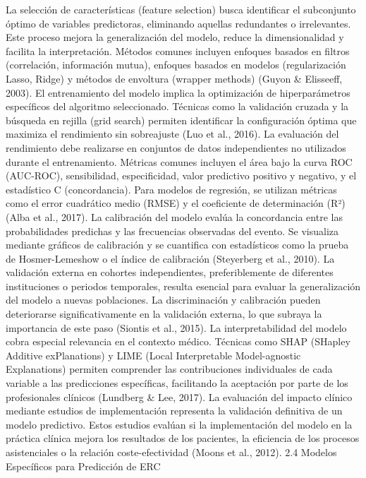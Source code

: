 \documentclass{article}
\begin{document}
\begin{multicols}{2}
La selección de características (feature selection) busca identificar el subconjunto óptimo de variables predictoras, eliminando aquellas redundantes o irrelevantes. Este proceso mejora la generalización del modelo, reduce la dimensionalidad y facilita la interpretación. Métodos comunes incluyen enfoques basados en filtros (correlación, información mutua), enfoques basados en modelos (regularización Lasso, Ridge) y métodos de envoltura (wrapper methods) (Guyon \& Elisseeff, 2003).
El entrenamiento del modelo implica la optimización de hiperparámetros específicos del algoritmo seleccionado. Técnicas como la validación cruzada y la búsqueda en rejilla (grid search) permiten identificar la configuración óptima que maximiza el rendimiento sin sobreajuste (Luo et al., 2016).
La evaluación del rendimiento debe realizarse en conjuntos de datos independientes no utilizados durante el entrenamiento. Métricas comunes incluyen el área bajo la curva ROC (AUC-ROC), sensibilidad, especificidad, valor predictivo positivo y negativo, y el estadístico C (concordancia). Para modelos de regresión, se utilizan métricas como el error cuadrático medio (RMSE) y el coeficiente de determinación (R²) (Alba et al., 2017).
La calibración del modelo evalúa la concordancia entre las probabilidades predichas y las frecuencias observadas del evento. Se visualiza mediante gráficos de calibración y se cuantifica con estadísticos como la prueba de Hosmer-Lemeshow o el índice de calibración (Steyerberg et al., 2010).
La validación externa en cohortes independientes, preferiblemente de diferentes instituciones o periodos temporales, resulta esencial para evaluar la generalización del modelo a nuevas poblaciones. La discriminación y calibración pueden deteriorarse significativamente en la validación externa, lo que subraya la importancia de este paso (Siontis et al., 2015).
La interpretabilidad del modelo cobra especial relevancia en el contexto médico. Técnicas como SHAP (SHapley Additive exPlanations) y LIME (Local Interpretable Model-agnostic Explanations) permiten comprender las contribuciones individuales de cada variable a las predicciones específicas, facilitando la aceptación por parte de los profesionales clínicos (Lundberg \& Lee, 2017).
La evaluación del impacto clínico mediante estudios de implementación representa la validación definitiva de un modelo predictivo. Estos estudios evalúan si la implementación del modelo en la práctica clínica mejora los resultados de los pacientes, la eficiencia de los procesos asistenciales o la relación coste-efectividad (Moons et al., 2012).
 2.4 Modelos Específicos para Predicción de ERC

\end{multicols}
\end{document}

